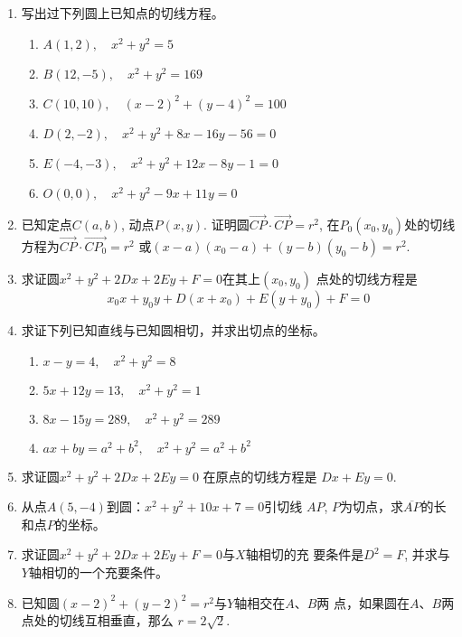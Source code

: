 \begin{ex}
\begin{enumerate}
    \item 写出过下列圆上已知点的切线方程。
\begin{enumerate}
    \item $A(1,2),\quad x^2+y^2=5$
    \item $B(12,-5),\quad x^2+y^2=169$
    \item $C(10,10),\quad (x-2)^2+(y-4)^2=100$
    \item $D(2,-2),\quad x^2+y^2+8x-16y-56=0$
    \item $E(-4,-3),\quad x^2+y^2+12x-8y-1=0$
    \item $O(0,0),\quad x^2+y^2-9x+11y=0$
\end{enumerate}

\item 已知定点$C(a,b)$, 动点$P(x,y)$. 证明圆$\Vec{CP}\cdot\Vec{CP}=r^2$, 在$P_0(x_0,y_0)$处的切线方程为$\Vec{CP}\cdot \Vec{CP_0}=r^2$
或$(x-a)(x_0-a)+(y-b)(y_0-b)=r^2$.
\item 求证圆$x^2+y^2+2Dx+2Ey+F=0$在其上$(x_0,y_0)$
点处的切线方程是
\[x_0x+y_0y+D(x+x_0)+E(y+y_0)+F=0\]
\item 求证下列已知直线与已知圆相切，并求出切点的坐标。
\begin{enumerate}
    \item $x-y=4,\quad x^2+y^2=8$
    \item $5x+12y=13,\quad x^2+y^2=1$
    \item $8x-15y=289,\quad x^2+y^2=289$
    \item $ax+by=a^2+b^2,\quad x^2+y^2=a^2+b^2$
\end{enumerate}

\item 求证圆$x^2+y^2+2Dx+2Ey=0$ 在原点的切线方程是
$Dx+Ey=0$.
\item 从点$A(5,-4)$到圆：$x^2+y^2+10x+7=0$引切线
$AP$, $P$为切点，求$\overline{AP}$的长和点$P$的坐标。
\item 求证圆$x^2+y^2+2Dx+2Ey+F=0$与$X$轴相切的充
要条件是$D^2=F$, 并求与$Y$轴相切的一个充要条件。
\item 已知圆$(x-2)^2+(y-2)^2=r^2$与$Y$轴相交在$A$、$B$两
点，如果圆在$A$、$B$两点处的切线互相垂直，那么
$r=2\sqrt{2}$.
\end{enumerate}   
\end{ex}



